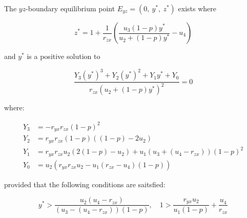 \begin{theorem}\label{thm:eq-boundary-yz-exist}
    The $yz$-boundary equilibrium point $E_{yz}=\left(0,\ y^*,\ z^*\right)$ exists where
    
    \begin{equation*}
        z^*=1+\frac{1}{r_{zx}}\left(\frac{u_3\left(1-p\right)y^*}{u_2+\left(1-p\right)y^*}-u_4\right)
    \end{equation*}

    and $y^*$ is a positive solution to 

    \begin{equation*}
        \frac{Y_3\left(y^*\right)^3+Y_2\left(y^*\right)^2+Y_1y^*+Y_0}{r_{zx}\left(u_2+\left(1-p\right)y^*\right)^2}=0
    \end{equation*}

    where:

    \begin{align*}
        Y_3 &= -r_{yx}r_{zx}\left(1-p\right)^2\\
        Y_2 &= r_{yx}r_{zx}\left(1-p\right)\left(\left(1-p\right)-2u_2\right)\\
        Y_1 &= r_{yx}r_{zx}u_2\left(2\left(1-p\right)-u_2\right)+u_1\left(u_3+\left(u_4-r_{zx}\right)\right)\left(1-p\right)^2\\
        Y_0 &= u_2\left(r_{yx}r_{zx}u_2-u_1\left(r_{zx}-u_4\right)\left(1-p\right)\right)
    \end{align*}

    provided that the following conditions are saitsfied:
    
    \begin{equation*}
        y^*>\frac{u_2\left(u_4-r_{zx}\right)}{\left(u_3-\left(u_4-r_{zx}\right)\right)\left(1-p\right)},\quad 1>\frac{r_{yx}u_2}{u_1\left(1-p\right)}+\frac{u_4}{r_{zx}}
    \end{equation*}
\end{theorem}
